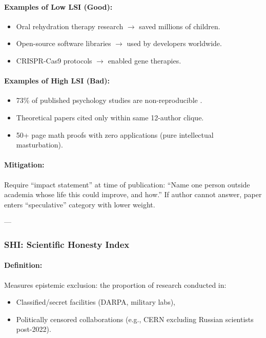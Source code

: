 \documentclass[11pt,a4paper]{article}
\theoremstyle{definition}
\theoremstyle{remark}
\begin{document}
\paragraph{Examples of Low LSI (Good):}
\begin{itemize}
\item Oral rehydration therapy research $\rightarrow$ saved millions of children.
\item Open-source software libraries $\rightarrow$ used by developers worldwide.
\item CRISPR-Cas9 protocols $\rightarrow$ enabled gene therapies.
\end{itemize}

\paragraph{Examples of High LSI (Bad):}
\begin{itemize}
\item 73\% of published psychology studies are non-reproducible \cite{osf_reproducibility}.
\item Theoretical papers cited only within same 12-author clique.
\item 50+ page math proofs with zero applications (pure intellectual masturbation).
\end{itemize}

\paragraph{Mitigation:}
Require ``impact statement'' at time of publication: ``Name one person outside academia whose life this could improve, and how.'' If author cannot answer, paper enters ``speculative'' category with lower weight.

---

\subsubsection{SHI: Scientific Honesty Index}

\paragraph{Definition:}
Measures epistemic exclusion: the proportion of research conducted in:
\begin{itemize}
\item Classified/secret facilities (DARPA, military labs),
\item Politically censored collaborations (e.g., CERN excluding Russian scientists post-2022).
\end{itemize}
\end{document}
